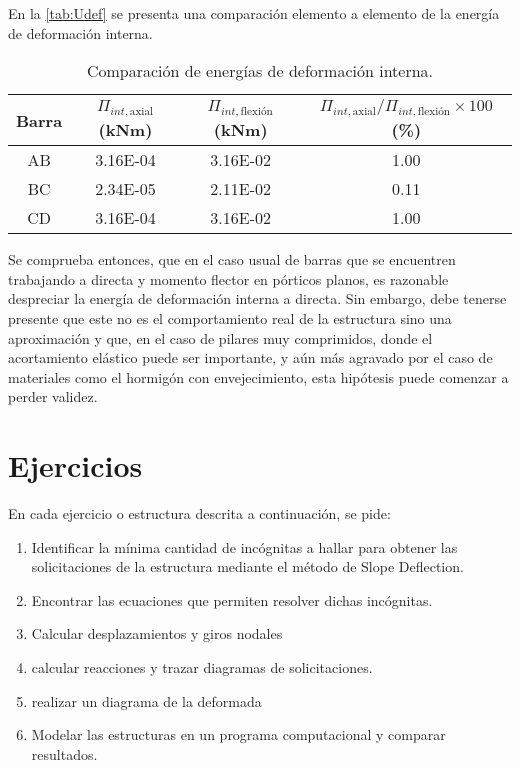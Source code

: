 En la \autoref{tab:Udef} se presenta una comparación elemento a elemento de la energía de deformación interna.

\begin{table}[htb]
	\centering
	\begin{tabular}{cccc}
		Barra & $\Pi_{int,\text{axial}}$  (kNm) & $\Pi_{int,\text{flexión}}$ (kNm) & $\Pi_{int,\text{axial}} / \Pi_{int,\text{flexión}} \times 100$  (\%) \\ \toprule
		AB             & 3.16E-04                & 3.16E-02                & 1.00                            \\
		BC             & 2.34E-05                & 2.11E-02                & 0.11                            \\
		CD             & 3.16E-04                & 3.16E-02                & 1.00                           
	\end{tabular}
	\caption{Comparación de energías de deformación interna.}
	\label{tab:Udef}
\end{table}

Se comprueba entonces, que en el caso usual de barras que se encuentren trabajando a directa y momento flector en pórticos planos, es razonable despreciar la energía de deformación interna a directa. %
%
Sin embargo, debe tenerse presente que este no es el comportamiento real de la estructura sino una aproximación y que, en el caso de pilares muy comprimidos, donde el acortamiento elástico puede ser importante, y aún más agravado por el caso de materiales como el hormigón con envejecimiento, esta hipótesis puede comenzar a perder validez. 







\section{Ejercicios}
\setcounter{ejercicio}{0}

En cada ejercicio o estructura descrita a continuación, se pide:
%
\begin{enumerate}
  \item Identificar la mínima cantidad de incógnitas a hallar para obtener las solicitaciones de la estructura mediante el método de Slope Deflection.
  \item  Encontrar las ecuaciones que permiten resolver dichas incógnitas.
  \item  Calcular desplazamientos y giros nodales
  \item calcular reacciones y trazar diagramas de solicitaciones.
  \item realizar un diagrama de la deformada
  \item  Modelar las estructuras en un programa computacional y comparar resultados.
\end{enumerate}



